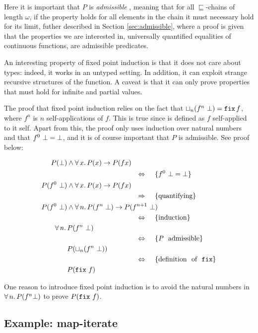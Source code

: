 Here it is important that $P$ is \emph{admissible} , meaning that for
all $\sqsubseteq$-chains of length $\omega$, if the property holds for
all elements in the chain it must necessary hold for its limit, futher
described in Section \ref{sec:admissible}, where a proof is given that
the properties we are interested in, universally quantified equalities
of continuous functions, are admissible predicates.

An interesting property of fixed point induction is that it does not
care about types: indeed, it works in an untyped setting. In addition,
it can exploit strange recursive structures of the function. A caveat
is that it can only prove properties that must hold for infinite and
partial values.

The proof that fixed point induction relies on the fact that
$\lub{n}(f^n \w \bot) \eq \hs{fix} \, f$, where $f^n$ is $n$
self-applications of $f$. This is true since  is defined as
$f$ self-applied to it self. Apart from this, the proof only uses
induction over natural numbers and that $f^0 \,\, \bot = \bot$, and
it is of course important that $P$ is admissible. See proof below:

\begin{align*}
P(\bot) & \wedge \fa{x} P(x) \rightarrow P(f x) \\
\desclra{$f^0 \w \bot \eq \bot$} \\
P(f^0 \w \bot) & \wedge \fa{x} P(x) \rightarrow P(f x) \\
\descra{quantifying} \\
P(f^0 \w \bot) & \wedge \fa{n} P(f^n \w \bot) \rightarrow P(f^{n+1} \w \bot) \\
\desclra{induction} \\
\fa{n} & P(f^n \w \bot) \\
\desclra{\textit{P} \w admissible} \\
& P(\lub{n}(f^n \w \bot)) \\
\desclra{definition \w of \w \hs{fix}} \\
& P(\hs{fix} \w f) \\
\end{align*}

One reason to introduce fixed point induction is to avoid the natural
numbers in $\forall \, n . \, P(f^n \bot)$  to prove $P(\hs{fix} \w f)$.

\subsection{Example: map-iterate}
\label{sec:mapiter}


